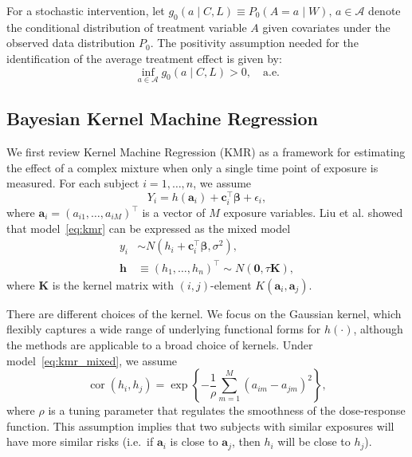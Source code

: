 For a stochastic intervention, let $g_0(a \mid C, L) \equiv P_0(A = a \mid W), \, a \in \mathcal{A}$ denote the conditional distribution of treatment variable $A$ given covariates under the observed data distribution $P_0$. The positivity assumption needed for the identification of the average treatment effect is given by:
\begin{equation*}
    \inf_{a \in \mathcal{A}} g_0(a \mid C, L) > 0, \quad \text{a.e.}
\end{equation*}

\subsection*{Bayesian Kernel Machine Regression}

We first review Kernel Machine Regression (KMR) as a framework for estimating the effect of a complex mixture when only a single time point of exposure is measured. For each subject $i = 1, \ldots, n$, we assume
\begin{equation}
    Y_i = h(\mathbf{a}_i) + \mathbf{c}_i^\top \boldsymbol{\beta} + \epsilon_i,
    \label{eq:kmr}
\end{equation}
where $\mathbf{a}_i = (a_{i1}, \ldots, a_{iM})^\top$ is a vector of $M$ exposure variables. Liu et al.\cite{liu_lin_ghosh_2007} showed that model~\eqref{eq:kmr} can be expressed as the mixed model
\begin{equation}
\begin{aligned}
    y_i &\sim N\!\left(h_i + \mathbf{c}_i^\top \boldsymbol{\beta}, \sigma^2\right), \\
    \mathbf{h} &\equiv (h_1, \ldots, h_n)^\top \sim N(\mathbf{0}, \tau \mathbf{K}),
\end{aligned}
\label{eq:kmr_mixed}
\end{equation}
where $\mathbf{K}$ is the kernel matrix with $(i, j)$-element $K(\mathbf{a}_i, \mathbf{a}_j)$.

There are different choices of the kernel. We focus on the Gaussian kernel, which flexibly captures a wide range of underlying functional forms for $h(\cdot)$, although the methods are applicable to a broad choice of kernels. Under model~\eqref{eq:kmr_mixed}, we assume
\begin{equation*}
    \operatorname{cor}(h_i, h_j) = \exp\!\left\{ -\frac{1}{\rho} \sum_{m=1}^{M} (a_{im} - a_{jm})^2 \right\},
\end{equation*}
where $\rho$ is a tuning parameter that regulates the smoothness of the dose-response function. This assumption implies that two subjects with similar exposures will have more similar risks (i.e.\ if $\mathbf{a}_i$ is close to $\mathbf{a}_j$, then $h_i$ will be close to $h_j$).


